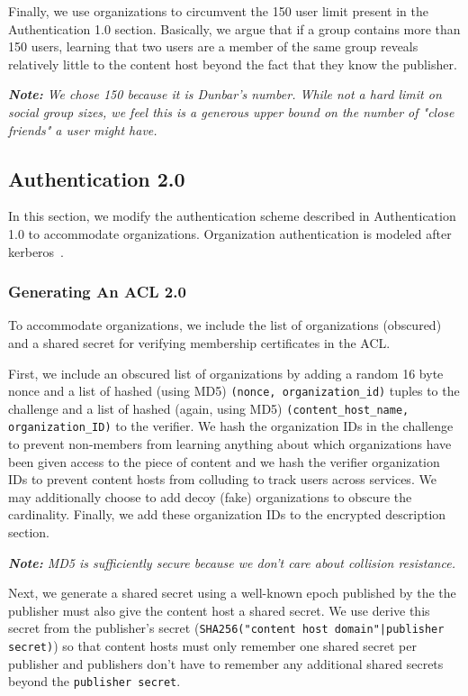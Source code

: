 \documentclass[pdftex,12pt,a4papaer]{article}
\newcommand{\note}[1]{\textit{\textbf{Note:} #1}}
\begin{document}
Finally, we use organizations to circumvent the 150 user limit present in the
Authentication 1.0 section. Basically, we argue that if a group contains more
than 150 users, learning that two users are a member of the same group reveals
relatively little to the content host beyond the fact that they know the
publisher.

\note{We chose 150 because it is Dunbar's \cite{dunbar} number. While not a hard
limit on social group sizes, we feel this is a generous upper bound on the
number of "close friends" a user might have.}

\subsection{Authentication 2.0}

In this section, we modify the authentication scheme described in Authentication
1.0 to accommodate organizations. Organization authentication is modeled after
kerberos~\cite{kerberos}.

\subsubsection{Generating An ACL 2.0}

To accommodate organizations, we include the list of organizations (obscured)
and a shared secret for verifying membership certificates in the ACL.

First, we include an obscured list of organizations by adding a random 16 byte
nonce and a list of hashed (using MD5) \texttt{(nonce, organization\_id)} tuples
to the challenge and a list of hashed (again, using MD5)
\texttt{(content\_host\_name, organization\_ID)} to the verifier. We hash the
organization IDs in the challenge to prevent non-members from learning anything
about which organizations have been given access to the piece of content and we
hash the verifier organization IDs to prevent content hosts from colluding to
track users across services. We may additionally choose to add decoy (fake)
organizations to obscure the cardinality. Finally, we add these organization IDs
to the encrypted description section.

\note{MD5 is sufficiently secure because we don't care about collision
resistance.}

Next, we generate a shared secret using a well-known epoch published by the  the publisher must also give the content host a
shared secret. We use derive this secret from the publisher's secret
(\texttt{SHA256("content host domain"|publisher secret)}) so that content hosts
must only remember one shared secret per publisher and publishers don't have to
remember any additional shared secrets beyond the \texttt{publisher secret}.
\end{document}
